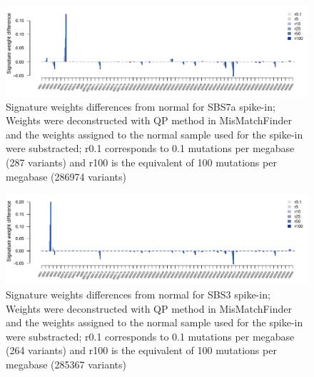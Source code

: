 \begin{figure}[!ht]
\centering
\includegraphics[width=.99\linewidth]{Figures/SBS7SpikeInSignatureDifferences.pdf}
\caption[Signature weights differences from normal for SBS7a spike-in]{Signature weights differences from normal for SBS7a spike-in; Weights were deconstructed with QP method in MisMatchFinder and the weights assigned to the normal sample used for the spike-in were substracted; r0.1 corresponds to 0.1 mutations per megabase (287 variants) and r100 is the equivalent of 100 mutations per megabase (286974 variants)}\label{A:fig:sbs7aspikeindifferences}
\end{figure}

\begin{figure}[!ht]
\centering
\includegraphics[width=.99\linewidth]{Figures/SBS3SpikeInSignatureDifferences.pdf}
\caption[Signature weights differences from normal for SBS3 spike-in]{Signature weights differences from normal for SBS3 spike-in; Weights were deconstructed with QP method in MisMatchFinder and the weights assigned to the normal sample used for the spike-in were substracted; r0.1 corresponds to 0.1 mutations per megabase (264 variants) and r100 is the equivalent of 100 mutations per megabase (285367 variants)}\label{A:fig:sbs3spikeindifferences}
\end{figure}
